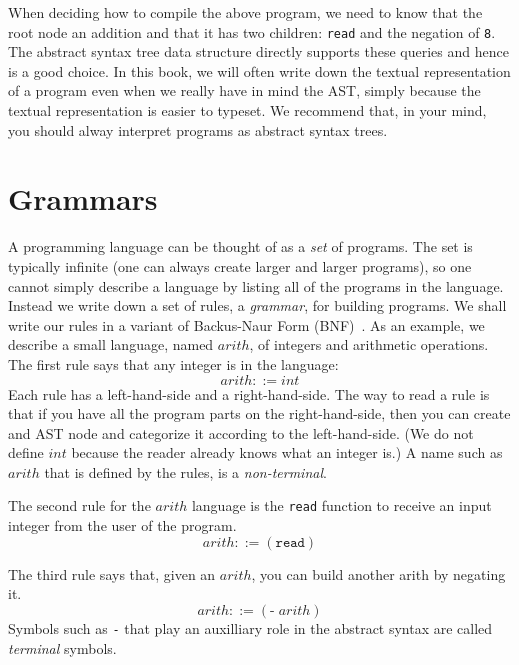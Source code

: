 \documentclass[12pt]{book}
\newcommand{\itm}[1]{\ensuremath{\mathit{#1}}}
\newcommand{\Int}{\itm{int}}
\newcommand{\key}[1]{\texttt{#1}}
\begin{document}
When deciding how to compile the above program, we need to know that
the root node an addition and that it has two children: \texttt{read}
and the negation of \texttt{8}. The abstract syntax tree data
structure directly supports these queries and hence is a good
choice. In this book, we will often write down the textual
representation of a program even when we really have in mind the AST,
simply because the textual representation is easier to typeset.  We
recommend that, in your mind, you should alway interpret programs as
abstract syntax trees.

\section{Grammars}
\label{sec:grammar}

A programming language can be thought of as a \emph{set} of programs.
The set is typically infinite (one can always create larger and larger
programs), so one cannot simply describe a language by listing all of
the programs in the language. Instead we write down a set of rules, a
\emph{grammar}, for building programs. We shall write our rules in a
variant of Backus-Naur Form (BNF)~\citep{Backus:1960aa,Knuth:1964aa}.
As an example, we describe a small language, named $\itm{arith}$, of
integers and arithmetic operations. The first rule says that any
integer is in the language:
\begin{equation}
\itm{arith} ::= \Int  \label{eq:arith-int}
\end{equation}
Each rule has a left-hand-side and a right-hand-side. The way to read
a rule is that if you have all the program parts on the
right-hand-side, then you can create and AST node and categorize it
according to the left-hand-side. (We do not define $\Int$ because the
reader already knows what an integer is.) A name such as $\itm{arith}$
that is defined by the rules, is a \emph{non-terminal}.

The second rule for the $\itm{arith}$ language is the \texttt{read}
function to receive an input integer from the user of the program.
\begin{equation}
  \itm{arith} ::= (\key{read}) \label{eq:arith-read}
\end{equation}

The third rule says that, given an $\itm{arith}$, you can build
another arith by negating it.
\begin{equation}
  \itm{arith} ::= (\key{-} \; \itm{arith})  \label{eq:arith-neg}
\end{equation}
Symbols such as \key{-} that play an auxilliary role in the abstract
syntax are called \emph{terminal} symbols.
\end{document}
